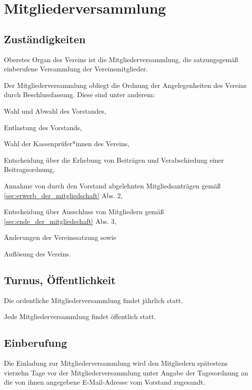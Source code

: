 \chapter{Mitgliederversammlung}

\section{Zuständigkeiten}
\begin{absätze}
	\item Oberstes Organ des Vereins ist die Mitgliederversammlung, die satzungsgemäß einberufene Versammlung der Vereinsmitglieder.
    \item Der Mitgliederversammlung obliegt die Ordnung der Angelegenheiten des Vereins durch Beschlussfassung. Diese sind unter anderem:
    \begin{sätze}
        \item Wahl und Abwahl des Vorstandes,
        \item Entlastung des Vorstands,
        \item Wahl der Kassenprüfer*innen des Vereins,
        \item Entscheidung über die Erhebung von Beiträgen und Verabschiedung einer Beitragsordnung,
        \item Annahme von durch den Vorstand abgelehnten Mitgliedsanträgen gemäß \ref{sec:erwerb_der_mitgliedschaft} Abs. 2,
        \item Entscheidung über Ausschluss von Mitgliedern gemäß \ref{sec:ende_der_mitgliedschaft} Abs. 3,
        \item Änderungen der Vereinssatzung sowie
        \item Auflösung des Vereins.
    \end{sätze}
\end{absätze}

\section{Turnus, Öffentlichkeit}
\begin{absätze}
    \item Die ordentliche Mitgliederversammlung findet jährlich statt.
    \item Jede Mitgliederversammlung findet öffentlich statt.
\end{absätze}

\section{Einberufung}\label{sec:einberufung}
Die Einladung zur Mitgliederversammlung wird den Mitgliedern spätestens vierzehn Tage vor der Mitgliederversammlung unter Angabe der Tagesordnung an die von ihnen angegebene E-Mail-Adresse vom Vorstand zugesandt.

